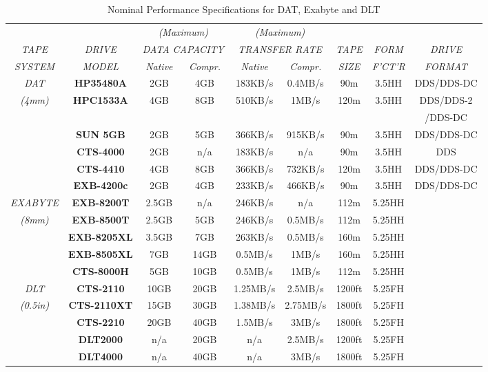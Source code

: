\documentclass[11pt]{article}
\begin{document}
\begin{table}[h]
\begin{scriptsize}
\begin {center}
\begin{tabular}{||c|c|c|c|c|c|c|c|c||} \hline
& & \multicolumn{2}{c|}{{\em (Maximum)}} &
\multicolumn{2}{c|}{{\em (Maximum)}} & & & \\
{\em TAPE} & {\em DRIVE} & \multicolumn{2}{c|}{{\em DATA CAPACITY}}
& \multicolumn{2}{c|}{{\em TRANSFER RATE}}
& {\em TAPE} & {\em FORM} & {\em DRIVE} \\ \cline{3-6}
{\em SYSTEM} & {\em MODEL} & {\em Native} & {\em Compr.}
& {\em Native} & {\em Compr.} & {\em SIZE} & {\em F'CT'R}
& {\em FORMAT} \\ \hline
{\em DAT} & {\bf HP35480A} & 2GB & 4GB & 183KB/s & 0.4MB/s
& 90m & 3.5HH & DDS/DDS-DC \\
{\em (4mm)} & {\bf HPC1533A} & 4GB & 8GB & 510KB/s & 1MB/s
& 120m & 3.5HH & DDS/DDS-2 \\
& & & & & & & & /DDS-DC \\
& {\bf SUN 5GB} & 2GB & 5GB & 366KB/s & 915KB/s
& 90m & 3.5HH & DDS/DDS-DC \\
& {\bf CTS-4000} & 2GB & n/a & 183KB/s & n/a
& 90m & 3.5HH & DDS \\
& {\bf CTS-4410} & 4GB & 8GB & 366KB/s & 732KB/s
& 120m & 3.5HH & DDS/DDS-DC \\
& {\bf EXB-4200c} & 2GB & 4GB & 233KB/s & 466KB/s
& 90m & 3.5HH & DDS/DDS-DC \\ \hline \hline
{\em EXABYTE} & {\bf EXB-8200T} & 2.5GB & n/a & 246KB/s & n/a
& 112m & 5.25HH & \\
{\em (8mm)} & {\bf EXB-8500T} & 2.5GB & 5GB & 246KB/s & 0.5MB/s
& 112m & 5.25HH & \\
& {\bf EXB-8205XL} & 3.5GB & 7GB & 263KB/s & 0.5MB/s
& 160m & 5.25HH & \\
& {\bf EXB-8505XL} & 7GB & 14GB & 0.5MB/s & 1MB/s
& 160m & 5.25HH & \\
& {\bf CTS-8000H} & 5GB & 10GB & 0.5MB/s & 1MB/s
& 112m & 5.25HH & \\ \hline \hline
{\em DLT} & {\bf CTS-2110} & 10GB & 20GB & 1.25MB/s & 2.5MB/s
& 1200ft & 5.25FH & \\
{\em (0.5in)} & {\bf CTS-2110XT} & 15GB & 30GB & 1.38MB/s & 2.75MB/s
& 1800ft & 5.25FH & \\
& {\bf CTS-2210} & 20GB & 40GB & 1.5MB/s & 3MB/s
& 1800ft & 5.25FH & \\
& {\bf DLT2000} & n/a & 20GB & n/a & 2.5MB/s
& 1200ft & 5.25FH & \\
& {\bf DLT4000} & n/a & 40GB & n/a & 3MB/s
& 1800ft & 5.25FH & \\ \hline
\end{tabular}
\caption {Nominal Performance Specifications for DAT, Exabyte and DLT}
\end{center}
\end{scriptsize}
\end{table}
\end{document}
